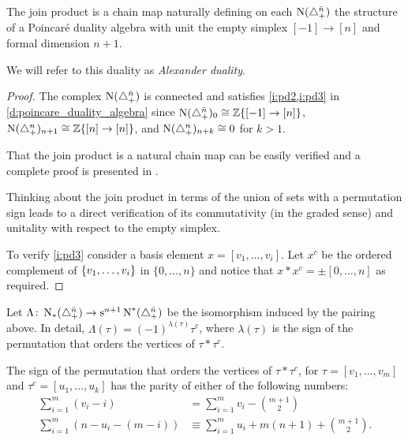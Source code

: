 \begin{theorem}
	The join product is a chain map naturally defining on each $\operatorname{N}(\triangle_{+}^{{\bar{n}}})$ the structure of a Poincar\'e duality algebra with unit the empty simplex $[-1] \to [n]$ and formal dimension $n+1$.
\end{theorem}
We will refer to this duality as \emph{Alexander duality}.

\begin{proof}
	The complex $\operatorname{N}(\triangle_{+}^{{\bar{n}}})$ is connected and satisfies \cref{i:pd2,i:pd3} in \cref{d:poincare_duality_algebra} since $\operatorname{N}(\triangle_{+}^{{\bar{n}}})_0 \cong \mathbb{Z}\{[-1] \to [n]\}$, $\operatorname{N}(\triangle_{+}^{n})_{n+1} \cong \mathbb{Z}\{[n] \to [n]\}$, and $\operatorname{N}(\triangle_{+}^{n})_{n+k} \cong 0$ for $k>1$.

	That the join product is a natural chain map can be easily verified and a complete proof is presented in \cite[p.19]{medina2020prop1}.

	Thinking about the join product in terms of the union of sets with a permutation sign leads to a direct verification of its commutativity (in the graded sense) and unitality with respect to the empty simplex.

	To verify \cref{i:pd3} consider a basis element $x = [v_1,\dots,v_i]$.
	Let $x^c$ be the ordered complement of $\{v_1,\dots,v_i\}$ in $\{0,\dots,n\}$ and notice that $x \ast x^c = \pm [0,\dots,n]$ as required.
\end{proof}

\begin{definition}
    Let $\Lambda\colon \operatorname{N}_*(\triangle_{+}^{\bar{n}})\to \operatorname{s}^{n+1}\operatorname{N}^*(\triangle_{+}^{\bar{n}})$ be the isomorphism induced by the pairing above. In detail, $\Lambda(\tau) = (-1)^{\lambda(\tau)}\tau^c$, where $\lambda(\tau)$ is the sign of the permutation that orders the vertices of $\tau*\tau^c$.
\end{definition}

\begin{remark}
    The sign of the permutation that orders the vertices of $\tau*\tau^c$, for $\tau = [v_1,\ldots,v_m]$ and $\tau^c  = [u_1,\ldots,u_k]$ has the parity of either of the following numbers:
    \begin{align*}
        \sum_{i=1}^m (v_i-i) &= \sum_{i=1}^m v_i - \binom{m+1}{2} \\
        \sum_{i=1}^m (n-u_i-(m-i)) &\equiv \sum_{i=1}^m u_i +m(n+1)+\binom{m+1}{2}.
    \end{align*}
\end{remark}